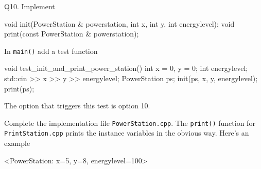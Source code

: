 Q10.
Implement
\begin{console}
void init(PowerStation & powerstation, int x, int y, int energylevel);
void print(const PowerStation & powerstation);
\end{console}

In \verb!main()! add a test function
\begin{console}
void test_init_and_print_power_station()
{
    int x = 0, y = 0;
    int energylevel;
    std::cin >> x >> y >> energylevel;
    PowerStation ps;
    init(ps, x, y, energylevel);
    print(ps);
}
\end{console}

The option that triggers this test is option 10.

Complete the implementation file \verb!PowerStation.cpp!.
The \verb!print()! function for \verb!PrintStation.cpp! prints the 
instance variables in the obvious way. Here's an example
\begin{console}
<PowerStation: x=5, y=8, energylevel=100>
\end{console}


